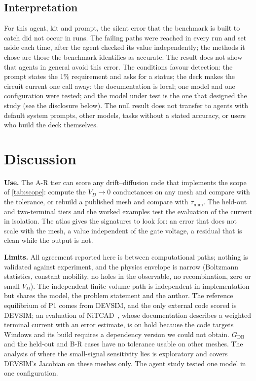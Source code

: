 \documentclass[11pt]{article}
\newcommand{\G}[1]{G_{\mathrm{#1}}}
\newcommand{\taunum}{\tau_{\mathrm{num}}}
\begin{document}
\subsection{Interpretation}
For this agent, kit and prompt, the silent error that the benchmark is built to catch did not occur in \agentRuns{} runs.
The failing paths were reached in every run and set aside each time, after the agent checked its value independently;
the methods it chose are those the benchmark identifies as accurate. The result does not show
that agents in general avoid this error. The conditions favour detection: the prompt states the 1\% requirement and asks
for a status; the deck makes the circuit current one call away; the documentation is local; one model and one configuration
were tested; and the model under test is the one that designed the study (see the disclosure below). The null result does
not transfer to agents with default system prompts, other models, tasks without a stated accuracy, or users who build the
deck themselves.

\section{Discussion}\label{sec:discussion}
\textbf{Use.} The A-R tier can score any drift--diffusion code that implements the scope of \cref{tab:scope}: compute the
$V_D \to 0$ conductances on any mesh and compare with the tolerance, or rebuild a published mesh and compare with
$\taunum$. The held-out and two-terminal tiers and the worked examples test the evaluation of the current in isolation.
The atlas gives the signatures to look for: an error that does not scale with the mesh, a value independent of the gate
voltage, a residual that is clean while the output is not.

\textbf{Limits.} All agreement reported here is between computational paths; nothing is validated against experiment, and
the physics envelope is narrow (Boltzmann statistics, constant mobility, no holes in the observable, no recombination,
zero or small $V_D$). The independent finite-volume path is independent in implementation but shares the model, the
problem statement and the author. The reference equilibrium of P1 comes from DEVSIM, and the only external code scored is DEVSIM; an
evaluation of NiTCAD~\cite{NiTCAD}, whose documentation describes a weighted terminal current with an error estimate, is on
hold because the code targets Windows and its build requires a dependency version we could not obtain. $\G{DB}$ and the held-out and
B-R cases have no tolerance usable on other meshes. The analysis of where the small-signal sensitivity lies is
exploratory and covers DEVSIM's Jacobian on these meshes only. The agent study tested one model in one configuration.
\end{document}
